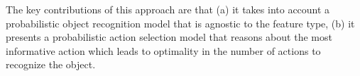 
    The key contributions of this approach are that (a) it takes into account a probabilistic object recognition model that is agnostic to the feature type, (b) it presents a probabilistic action selection model that reasons about the most informative action which leads to optimality in the number of actions to recognize the object. %



